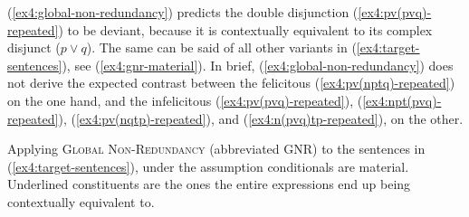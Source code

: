 \begin{exe}
	\label{ex4:global-non-redundancy}
	\label{ex4:structural-complexity}
\end{exe}

(\ref{ex4:global-non-redundancy}) predicts the double disjunction (\ref{ex4:pv(pvq)-repeated}) to be deviant, because it is contextually equivalent to its complex disjunct ($p\vee q$). The same can be said of all other variants in (\ref{ex4:target-sentences}), see (\ref{ex4:gnr-material}). In brief, (\ref{ex4:global-non-redundancy}) does not derive the expected contrast between the felicitous (\ref{ex4:pv(nptq)-repeated}) on the one hand, and the infelicitous (\ref{ex4:pv(pvq)-repeated}), (\ref{ex4:npt(pvq)-repeated}), (\ref{ex4:pv(nqtp)-repeated}), and (\ref{ex4:n(pvq)tp-repeated}), on the other.

\begin{exe}
	\ex Applying \textsc{Global Non-Redundancy} (abbreviated GNR) to the sentences in (\ref{ex4:target-sentences}), under the assumption conditionals are material. Underlined constituents are the ones the entire expressions end up being contextually equivalent to. \label{ex4:gnr-material}
	\begin{xlist}
		\label{ex4:pv(pvq)-gnr-material}
		\label{ex4:npt(pvq)-gnr-material}
		\label{ex4:pv(nptq)-gnr-material}
		\label{ex4:pv(nqtp)-gnr-material}
		\label{ex4:n(pvq)tp-gnr-material}
	\end{xlist}
\end{exe}

